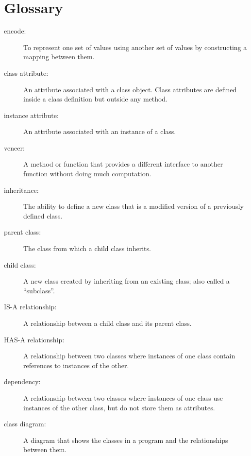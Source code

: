 \documentclass[
DIV=11,
fontsize=12,
twoside,
headinclude=false,
titlepage=firstiscover,
abstract=true,
headsepline=true,
footsepline=true,
chapterprefix=true, %
headings=big,
bibliography=totoc,%
captions=tableheading
]{scrbook}
\theoremstyle{definition}
\begin{document}
\section{Glossary}

\begin{description}

\item[encode:]  To represent one set of values using another
set of values by constructing a mapping between them.

\item[class attribute:] An attribute associated with a class
object.  Class attributes are defined inside
a class definition but outside any method.

\item[instance attribute:] An attribute associated with an
instance of a class.

\item[veneer:] A method or function that provides a different
interface to another function without doing much computation.

\item[inheritance:] The ability to define a new class that is a
modified version of a previously defined class.

\item[parent class:] The class from which a child class inherits.

\item[child class:] A new class created by inheriting from an
existing class; also called a ``subclass''.

\item[IS-A relationship:] A relationship between a child class
and its parent class.

\item[HAS-A relationship:] A relationship between two classes
where instances of one class contain references to instances of
the other.

\item[dependency:] A relationship between two classes
where instances of one class use instances of the other class,
but do not store them as attributes.

\item[class diagram:] A diagram that shows the classes in a program
and the relationships between them.


\end{description}
\end{document}
